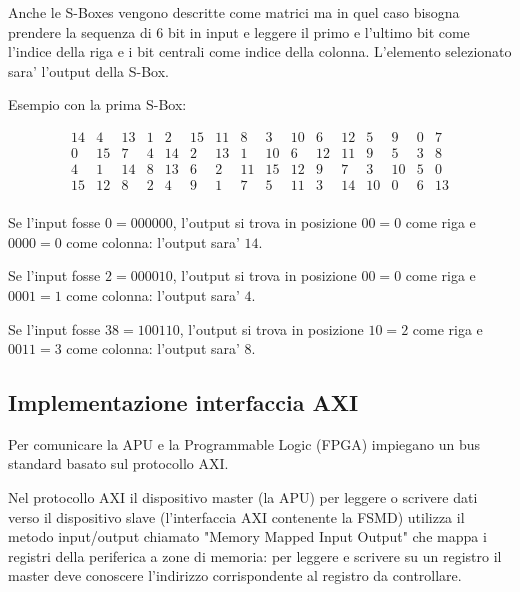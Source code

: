 \documentclass[a4paper]{article}
\begin{document}
Anche le S-Boxes vengono descritte come matrici ma in quel caso bisogna prendere la sequenza di 6 bit in input e leggere il primo e l'ultimo bit come l'indice della riga e i bit centrali come indice della colonna.
L'elemento selezionato sara' l'output della S-Box.


Esempio con la prima S-Box:

$$
\begin{matrix}
14 & 4  & 13 & 1 & 2  & 15 & 11 & 8  & 3  & 10 & 6  & 12 & 5  & 9  & 0 & 7 \\
0  & 15 & 7  & 4 & 14 & 2  & 13 & 1  & 10 & 6  & 12 & 11 & 9  & 5  & 3 & 8 \\
4  & 1  & 14 & 8 & 13 & 6  & 2  & 11 & 15 & 12 & 9  & 7  & 3  & 10 & 5 & 0 \\
15 & 12 & 8  & 2 & 4  & 9  & 1  & 7  & 5  & 11 & 3  & 14 & 10 & 0  & 6 & 13 \\
\end{matrix}
$$

Se l'input fosse $0 = 000000$, l'output si trova in posizione $00 = 0$ come riga e $0000 = 0$ come colonna: l'output sara' $14$.

Se l'input fosse $2 = 000010$, l'output si trova in posizione $00 = 0$ come riga e $0001 = 1$ come colonna: l'output sara' $4$.

Se l'input fosse $38 = 100110$, l'output si trova in posizione $10 = 2$ come riga e $0011 = 3$ come colonna: l'output sara' $8$.


\subsection{Implementazione interfaccia AXI}

Per comunicare la APU e la Programmable Logic (FPGA) impiegano un bus standard basato sul protocollo AXI.

Nel protocollo AXI il dispositivo master (la APU) per leggere o scrivere dati verso il dispositivo slave (l'interfaccia AXI contenente la FSMD) utilizza il metodo input/output chiamato "Memory Mapped Input Output" che mappa i registri della periferica a zone di memoria:
per leggere e scrivere su un registro il master deve conoscere l'indirizzo corrispondente al registro da controllare.
\end{document}

